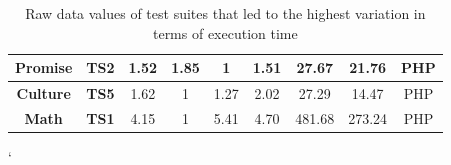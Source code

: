\begin{table}[h]
{\begin{tabular}{|c|c|c|c|c|c|c|c|c|}
			\textbf{Promise}                  & \textbf{TS2}                   & 1.52          & 1.85        & 1            & 1.51        & \cellcolor[HTML]{E3E3E3}27.67  & 21.76                   & PHP                   \\ \hline
			\textbf{Culture}                  & \textbf{TS5}                   & 1.62          & 1           & 1.27         & 2.02        & \cellcolor[HTML]{E3E3E3}27.29  & 14.47                   & PHP                   \\ \hline
			\textbf{Math}                     & \textbf{TS1}                   & 4.15          & 1           & 5.41         & 4.70        & \cellcolor[HTML]{E3E3E3}481.68 & 273.24                  & PHP                   \\ \hline
		\end{tabular}%
	}
	\caption{Raw data values of test suites that led to the highest variation in terms of execution time}
	\label{perf-tab}`
\end{table}

